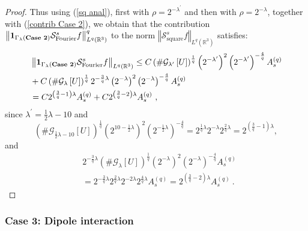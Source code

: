 \documentclass{amsart}%
\theoremstyle{plain}
\numberwithin{equation}{section}
\begin{document}
\begin{proof}
Thus using (\ref{sq anal}), first with $\rho=2^{-\lambda^{\prime}}$ and then
with $\rho=2^{-\lambda}$, together with (\ref{contrib Case 2}), we obtain that
the contribution $\left\Vert \mathbf{1}_{\Gamma_{\lambda}\left(
\text{\textbf{Case 2}}\right)  }\mathcal{S}_{\operatorname*{Fourier}}%
^{s}f\right\Vert _{L^{q}\left(  \mathbb{R}^{3}\right)  }^{q}$ to the norm
$\left\Vert \mathcal{S}_{\operatorname*{square}}^{s}f\right\Vert
_{L^{q}\left(  \mathbb{R}^{3}\right)  }$ satisfies:
\begin{align}
&  \left\Vert \mathbf{1}_{\Gamma_{\lambda}\left(  \text{\textbf{Case 2}%
}\right)  }\mathcal{S}_{\operatorname*{Fourier}}^{s}f\right\Vert
_{L^{q}\left(  \mathbb{R}^{3}\right)  }\leq C\left(  \#\mathcal{G}%
_{\lambda^{\prime}}\left[  U\right]  \right)  ^{\frac{1}{q}}\left(
2^{-\lambda^{\prime}}\right)  ^{2}\left(  2^{-\lambda^{\prime}}\right)
^{-\frac{4}{q}}A_{s}^{\left(  q\right)  }\label{case 2 est}\\
&  +C\left(  \#\mathcal{G}_{\lambda}\left[  U\right]  \right)  ^{\frac{1}{q}%
}2^{-\frac{3}{q}\lambda}\left(  2^{-\lambda}\right)  ^{2}\left(  2^{-\lambda
}\right)  ^{-\frac{4}{q}}A_{s}^{\left(  q\right)  }\nonumber\\
&  =C2^{\left(  \frac{3}{q}-1\right)  \lambda}A_{s}^{\left(  q\right)
}+C2^{\left(  \frac{3}{q}-2\right)  \lambda}A_{s}^{\left(  q\right)
}\ ,\nonumber
\end{align}
since $\lambda^{\prime}=\frac{1}{2}\lambda-10$ and%
\[
\left(  \#\mathcal{G}_{\frac{1}{2}\lambda-10}\left[  U\right]  \right)
^{\frac{1}{q}}\left(  2^{10-\frac{1}{2}\lambda}\right)  ^{2}\left(
2^{-\frac{1}{2}\lambda}\right)  ^{-\frac{4}{q}}=2^{\frac{1}{q}\lambda
}2^{-\lambda}2^{\frac{2}{q}\lambda}=2^{\left(  \frac{3}{q}-1\right)  \lambda
},
\]
and%
\begin{align*}
&  2^{-\frac{3}{q}\lambda}\left(  \#\mathcal{G}_{\lambda}\left[  U\right]
\right)  ^{\frac{1}{q}}\left(  2^{-\lambda}\right)  ^{2}\left(  2^{-\lambda
}\right)  ^{-\frac{4}{q}}A_{s}^{\left(  q\right)  }\\
&  =2^{-\frac{3}{q}\lambda}2^{\frac{2}{q}\lambda}2^{-2\lambda}2^{\frac{4}%
{q}\lambda}A_{s}^{\left(  q\right)  }=2^{\left(  \frac{3}{q}-2\right)
\lambda}A_{s}^{\left(  q\right)  }\ .
\end{align*}

\end{proof}

\subsubsection{Case 3: Dipole interaction\label{Sub Case 3}}
\end{document}
